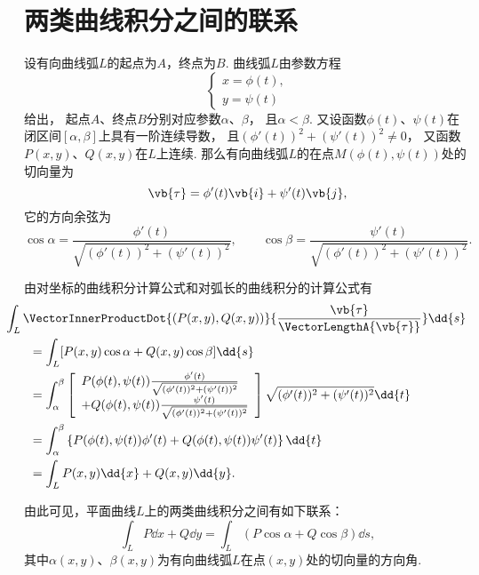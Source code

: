 \section{两类曲线积分之间的联系}
\begingroup
\def\innerProductTau{(\phi'(t))^2+(\psi'(t))^2}%
\def\lenTau{\sqrt{\innerProductTau}}%
\def\fTau#1{\frac{#1}{\lenTau}}%
\def\funcParam{(\phi(t),\psi(t))}%

设有向曲线弧\(L\)的起点为\(A\)，终点为\(B\).
曲线弧\(L\)由参数方程\begin{equation*}
	\begin{cases}
		x = \phi(t), \\
		y = \psi(t)
	\end{cases}
\end{equation*}给出，
起点\(A\)、终点\(B\)分别对应参数\(\alpha\)、\(\beta\)，
且\(\alpha < \beta\).
又设函数\(\phi(t)\)、\(\psi(t)\)在闭区间\([\alpha,\beta]\)上具有一阶连续导数，
且\(\innerProductTau\neq0\)，
又函数\(P(x,y)\)、\(Q(x,y)\)在\(L\)上连续.
那么有向曲线弧\(L\)的在点\(M(\phi(t),\psi(t))\)处的切向量为\begin{equation*}
	\vb{\tau} = \phi'(t) \vb{i} + \psi'(t) \vb{j},
\end{equation*}
它的方向余弦为\begin{equation*}
	\cos\alpha
	=\fTau{\phi'(t)},
	\qquad
	\cos\beta
	=\fTau{\psi'(t)}.
\end{equation*}

由对坐标的曲线积分计算公式和对弧长的曲线积分的计算公式有
\begin{align*}
	&\hspace{-20pt}
	\int_L \VectorInnerProductDot
			{(P(x,y),Q(x,y))}
			{\frac{\vb{\tau}}{\VectorLengthA{\vb{\tau}}}}
			\dd{s} \\
	&= \int_L [P(x,y)\cos\alpha+Q(x,y)\cos\beta]\dd{s} \\
	&= \int_\alpha^\beta
		\left[
			\begin{array}{l}
				P\funcParam\fTau{\phi'(t)} \\
				+Q\funcParam\fTau{\psi'(t)}
			\end{array}
		\right]
		\lenTau \dd{t} \\
	&= \int_\alpha^\beta \left\{
			P\funcParam\phi'(t) + Q\funcParam\psi'(t)
		\right\} \dd{t} \\
	&= \int_L{P(x,y)\dd{x}+Q(x,y)\dd{y}}.
\end{align*}
\endgroup

由此可见，平面曲线\(L\)上的两类曲线积分之间有如下联系：
\begin{equation}\label{equation:线积分与面积分.平面曲线上两类曲线积分之间的联系}
	\int_L P\dd{x}+Q\dd{y}
	=\int_L (P\cos\alpha+Q\cos\beta)\dd{s},
\end{equation}
其中\(\alpha(x,y)\)、\(\beta(x,y)\)为有向曲线弧\(L\)在点\((x,y)\)处的切向量的方向角.

